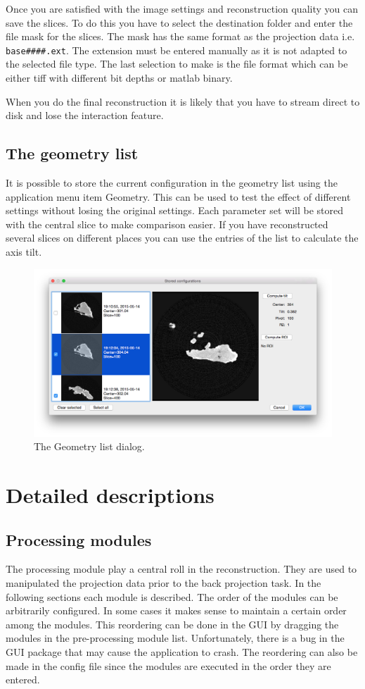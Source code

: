 \documentclass[a4paper]{scrreprt}
\begin{document}
Once you are satisfied with the image settings and reconstruction quality you can save the slices. To do this you have to select the destination folder and enter the file mask for the slices. The mask has the same format as the projection data i.e. \verb+base####.ext+. The extension must be entered manually as it is not adapted to the selected file type. The last selection to make is the file format which can be either tiff with different bit depths or matlab binary.

When you do the final reconstruction it is likely that you have to stream direct to disk and lose the interaction feature.

\section{The geometry list}
It is possible to store the current configuration in the geometry list using the application menu item Geometry. This can be used to test the effect of different settings without losing the original settings. Each parameter set will be stored with the central slice to make comparison easier. If you have reconstructed several slices on different places you can use the entries of the list to calculate the axis tilt. 
\begin{figure}[ht!]
\centering
\includegraphics[scale=0.4]{figures3/GeometryListDlg.png}
\caption{The Geometry list dialog.}
\end{figure}


\chapter{Detailed descriptions}
\section{Processing modules}
The processing module play a central roll in the reconstruction. They are used to manipulated the projection data prior to the back projection task. In the following sections each module is described. The order of the modules can be arbitrarily configured. In some cases it makes sense to maintain a certain order among the modules. This reordering can be done in the GUI by dragging the modules in the pre-processing module list. Unfortunately, there is a bug in the
GUI package that may cause the application to crash. The reordering can also be made in the config file since the modules are executed in the order they are entered.
\end{document}
